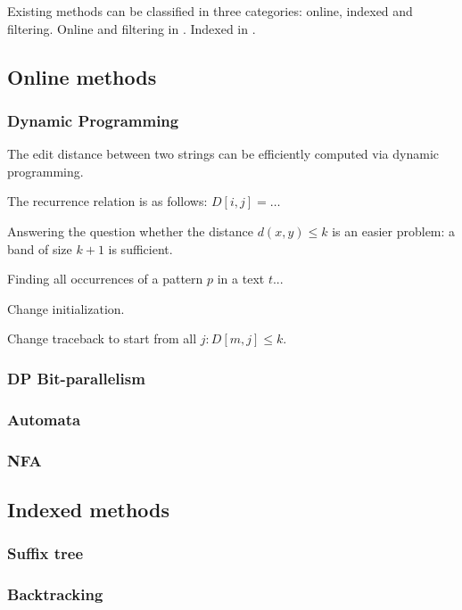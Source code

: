 Existing methods can be classified in three categories: online, indexed and filtering.
Online and filtering in \cite{Navarro1998}. Indexed in \cite{Navarro2001}.


\subsection{Online methods}

\subsubsection{Dynamic Programming}

The edit distance between two strings can be efficiently computed via dynamic programming.

The recurrence relation is as follows: $D[i,j] = \dots$

Answering the question whether the distance $d(x,y) \leq k$ is an easier problem: a band of size $k+1$ is sufficient.

Finding all occurrences of a pattern $p$ in a text $t$...

Change initialization.

Change traceback to start from all $j : D[m,j] \leq k$.


\subsubsection{DP Bit-parallelism}


\subsubsection{Automata}

\subsubsection{NFA}



\subsection{Indexed methods}

\subsubsection{Suffix tree}

\subsubsection{Backtracking}

